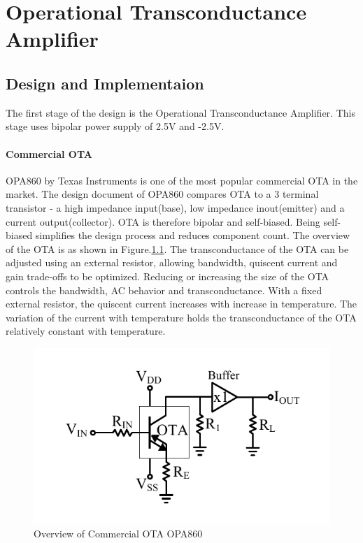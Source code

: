 \chapter{Operational Transconductance Amplifier}

\section{Design and Implementaion}

The first stage of the design is the Operational Transconductance Amplifier. This stage uses bipolar power supply of 2.5V and -2.5V. 

\subsubsection{Commercial OTA}
OPA860 by Texas Instruments is one of the most popular commercial OTA in the market. The design document \cite{opa860} of OPA860 compares OTA to a 3 terminal transistor - a high impedance input(base), low impedance inout(emitter) and a current output(collector). OTA is therefore bipolar and self-biased. Being self-biased simplifies the design process and reduces component count. The overview of the OTA is as shown in Figure.\ref{fig:OPA}. The transconductance of the OTA can be adjusted using an external resistor, allowing bandwidth, quiscent current and gain trade-offs to be optimized. Reducing or increasing the size of the OTA controls the bandwidth, AC behavior and transconductance. With a fixed external resistor, the quiscent current increases with increase in temperature. The variation of the current with temperature holds the transconductance of the OTA relatively constant with temperature.

\begin{figure} [H]
\centering
\includegraphics[scale=1]{Figures/Misc/PDFs/OPA.pdf}
\caption{Overview of Commercial OTA OPA860}
\label{fig:OPA}
\end{figure}

